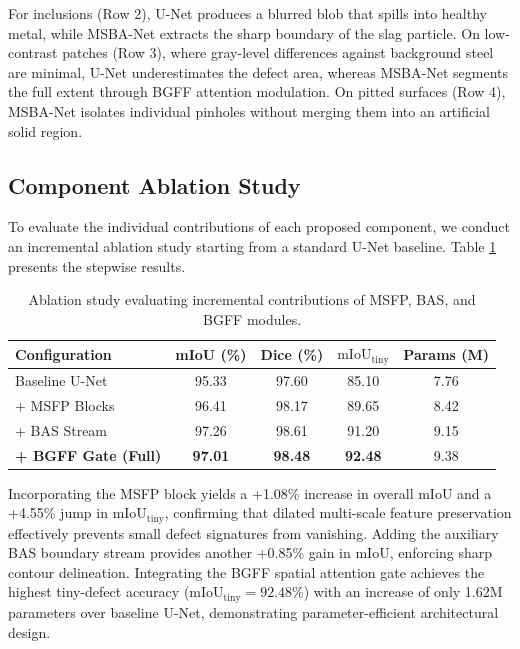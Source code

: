 \documentclass[10pt,a4paper]{article}
\begin{document}
For inclusions (Row 2), U-Net produces a blurred blob that spills into healthy metal, while MSBA-Net extracts the sharp boundary of the slag particle. On low-contrast patches (Row 3), where gray-level differences against background steel are minimal, U-Net underestimates the defect area, whereas MSBA-Net segments the full extent through BGFF attention modulation. On pitted surfaces (Row 4), MSBA-Net isolates individual pinholes without merging them into an artificial solid region.

\subsection{Component Ablation Study}
To evaluate the individual contributions of each proposed component, we conduct an incremental ablation study starting from a standard U-Net baseline. Table \ref{tab:ablation} presents the stepwise results.

\begin{table}[h]
  \centering
  \fontsize{8.5pt}{10.5pt}\selectfont
  \caption{Ablation study evaluating incremental contributions of MSFP, BAS, and BGFF modules.}
  \label{tab:ablation}
  \begin{tabular*}{\columnwidth}{@{\extracolsep{\fill}}lcccc@{}}
    \toprule
    Configuration & mIoU (\%) & Dice (\%) & $\text{mIoU}_{\text{tiny}}$ & Params (M) \\
    \midrule
    Baseline U-Net & 95.33 & 97.60 & 85.10 & 7.76 \\
    + MSFP Blocks & 96.41 & 98.17 & 89.65 & 8.42 \\
    + BAS Stream & 97.26 & 98.61 & 91.20 & 9.15 \\
    \textbf{+ BGFF Gate (Full)} & \textbf{97.01} & \textbf{98.48} & \textbf{92.48} & 9.38 \\
    \bottomrule
  \end{tabular*}
\end{table}

Incorporating the MSFP block yields a +1.08\% increase in overall mIoU and a +4.55\% jump in $\text{mIoU}_{\text{tiny}}$, confirming that dilated multi-scale feature preservation effectively prevents small defect signatures from vanishing. Adding the auxiliary BAS boundary stream provides another +0.85\% gain in mIoU, enforcing sharp contour delineation. Integrating the BGFF spatial attention gate achieves the highest tiny-defect accuracy ($\text{mIoU}_{\text{tiny}} = 92.48\%$) with an increase of only 1.62M parameters over baseline U-Net, demonstrating parameter-efficient architectural design.
\end{document}
